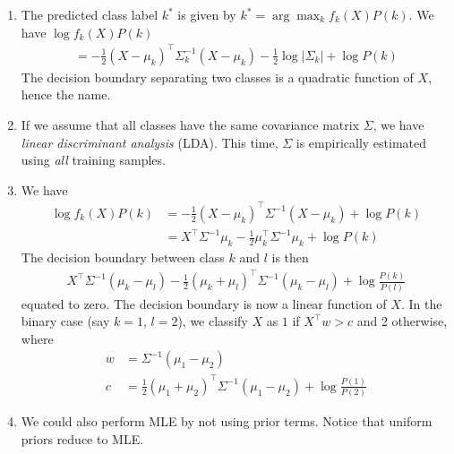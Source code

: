 \documentclass[10pt]{article}
\begin{document}
\begin{multicols}{2}
\begin{addmargin}[0.8em]{0.5em}
\begin{enumerate}[label=(\alph*)]
        \item The predicted class label $k^*$ is given by $k^* = \arg\max_{k} f_k(X) P(k)$. We have $\log{f_k(X) P(k)}$
        \begin{align*}
        = -\frac{1}{2} (X - \mu_k)^\top \Sigma_k^{-1} (X - \mu_k) - \frac{1}{2} \log{|\Sigma_k|} + \log{P(k)}
        \end{align*}
        The decision boundary separating two classes is a quadratic function of $X$, hence the name.
        
        \item If we assume that all classes have the same covariance matrix $\Sigma$, we have \textit{linear discriminant analysis} (LDA). This time, $\Sigma$ is empirically estimated using \textit{all} training samples.
        
        \item We have
        \begin{align*}
        \log{f_k(X) P(k)} &= -\frac{1}{2} (X - \mu_k)^\top \Sigma^{-1} (X - \mu_k) + \log{P(k)} \\
        &= X^\top \Sigma^{-1} \mu_k - \frac{1}{2} \mu_k^\top \Sigma^{-1} \mu_k + \log{P(k)}
        \end{align*}
        The decision boundary between class $k$ and $l$ is then
        \begin{align*}
        X^\top \Sigma^{-1} (\mu_k - \mu_l) - \frac{1}{2} (\mu_k + \mu_l)^\top \Sigma^{-1} (\mu_k - \mu_l) + \log{\frac{P(k)}{P(l)}}
        \end{align*}
        equated to zero. The decision boundary is now a linear function of $X$. In the binary case (say $k=1$, $l=2$), we classify $X$ as $1$ if $X^\top w > c$ and 2 otherwise, where
        \begin{align*}
        w &= \Sigma^{-1}(\mu_1 - \mu_2) \\
        c &= \frac{1}{2} (\mu_1 + \mu_2)^\top \Sigma^{-1} (\mu_1 - \mu_2) + \log{\frac{P(1)}{P(2)}}
        \end{align*}
        
        \item We could also perform MLE by not using prior terms. Notice that uniform priors reduce to MLE. 
        

\end{enumerate}
\end{addmargin}
\end{multicols}
\end{document}
